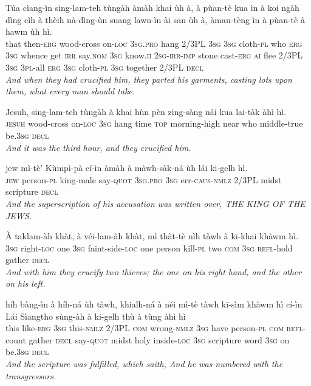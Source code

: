 \documentclass[11pt,a4paper]{article}
\begin{document}
\begin{exe}
\gll Túa cìang-ìn sing-lam-teh tùngàh àmàh khai ùh à, à pùan-tè kua ìn à koi ngàh dìng cìh à thèih nà-dìng-ùn suang lawn-ìn ài sān ùh à, àmau-tèng ìn à pùan-tè à hawm ùh hì. \\
     that then-\textsc{erg} wood-cross on-\textsc{loc} \textsc{3sg}.\textsc{pro} hang 2/3PL \textsc{3sg} \textsc{3sg} cloth-\textsc{pl} who \textsc{erg} \textsc{3sg} whence get \textsc{irr} say.\textsc{nom} \textsc{3sg} know.\textsc{ii} \textsc{2sg}-\textsc{irr}-\textsc{imp} stone cast-\textsc{erg} \textsc{ai} flee 2/3PL \textsc{3sg} \textsc{3pl}-all \textsc{erg} \textsc{3sg} cloth-\textsc{pl} \textsc{3sg} together 2/3PL \textsc{decl} \\
\glt \textcolor{kjvcolor}{\textit{And when they had crucified him, they parted his garments, casting lots upon them, what every man should take.}}

\gll Jesuh, sing-lam-teh tùngàh à khai hùn pèn zing-sàng nái kua lai-tàk àhì hì. \\
     \textsc{jesuh} wood-cross on-\textsc{loc} \textsc{3sg} hang time \textsc{top} morning-high near who middle-true be.\textsc{3sg} \textsc{decl} \\
\glt \textcolor{kjvcolor}{\textit{And it was the third hour, and they crucified him.}}

\gll jew mì-tè' Kùmpì-pà cí-ìn àmàh à màwh-sàk-ná ùh lái ki-gelh hì. \\
     \textsc{jew} person-\textsc{pl} king-male say-\textsc{quot} \textsc{3sg}.\textsc{pro} \textsc{3sg} err-\textsc{caus}-\textsc{nmlz} 2/3PL midst scripture \textsc{decl} \\
\glt \textcolor{kjvcolor}{\textit{And the superscription of his accusation was written over, THE KING OF THE JEWS.}}

\gll À taklam-àh khàt, à véi-lam-àh khàt, mì thàt-tè nìh tàwh à kī-khai khàwm hì. \\
     \textsc{3sg} right-\textsc{loc} one \textsc{3sg} faint-side-\textsc{loc} one person kill-\textsc{pl} two \textsc{com} \textsc{3sg} \textsc{refl}-hold gather \textsc{decl} \\
\glt \textcolor{kjvcolor}{\textit{And with him they crucify two thieves; the one on his right hand, and the other on his left.}}

\gll híh bàng-ìn à híh-ná ùh tàwh, khialh-ná à néi mì-tè tàwh kī-sìm khàwm hì cí-ìn Lái Sìangtho sùng-àh à ki-gelh thù à tùng àhì hì \\
     this like-\textsc{erg} \textsc{3sg} this-\textsc{nmlz} 2/3PL \textsc{com} wrong-\textsc{nmlz} \textsc{3sg} have person-\textsc{pl} \textsc{com} \textsc{refl}-count gather \textsc{decl} say-\textsc{quot} midst holy inside-\textsc{loc} \textsc{3sg} scripture word \textsc{3sg} on be.\textsc{3sg} \textsc{decl} \\
\glt \textcolor{kjvcolor}{\textit{And the scripture was fulfilled, which saith, And he was numbered with the transgressors.}}


\end{exe}
\end{document}
